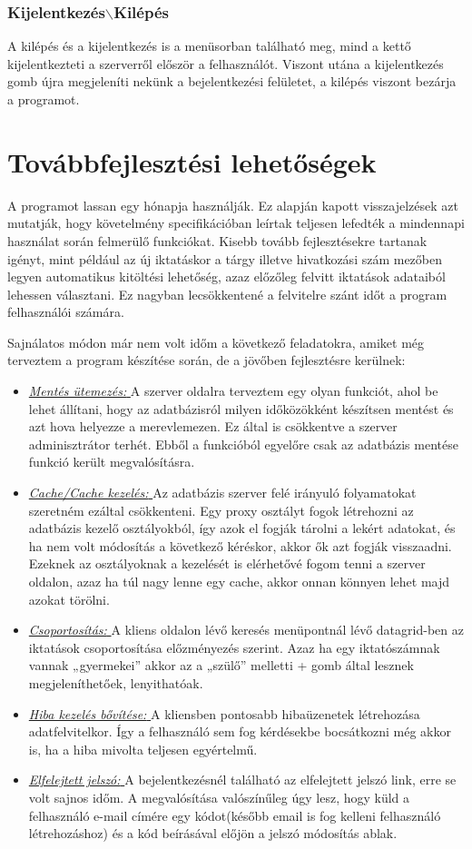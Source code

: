 \documentclass[
]{thesis-ekf}
\theoremstyle{definition}
\theoremstyle{remark}
\begin{document}
\subsection{Kijelentkezés$\backslash$Kilépés}
A kilépés és a kijelentkezés is a menüsorban található meg, mind a kettő kijelentkezteti a szerverről először a felhasználót. Viszont utána a kijelentkezés gomb újra megjeleníti nekünk a bejelentkezési felületet, a kilépés viszont bezárja a programot.
\chapter{Továbbfejlesztési lehetőségek}
A programot lassan egy hónapja használják. Ez alapján kapott visszajelzések azt mutatják, hogy követelmény specifikációban leírtak teljesen lefedték a mindennapi használat során felmerülő funkciókat. Kisebb tovább fejlesztésekre tartanak igényt, mint például az új iktatáskor a tárgy illetve hivatkozási szám mezőben legyen automatikus kitöltési lehetőség, azaz előzőleg felvitt iktatások adataiból lehessen választani. Ez nagyban lecsökkentené a felvitelre szánt időt a program felhasználói számára. 

Sajnálatos módon már nem volt időm a következő feladatokra, amiket még terveztem a program készítése során, de a jövőben fejlesztésre kerülnek:
\begin{itemize}[leftmargin=0pt]
	\item \underline{\textit{Mentés ütemezés: }}A szerver oldalra terveztem egy olyan funkciót, ahol be lehet állítani, hogy az adatbázisról milyen időközökként készítsen mentést és azt hova helyezze a merevlemezen. Ez által is csökkentve a szerver adminisztrátor terhét. Ebből a funkcióból egyelőre csak az adatbázis mentése funkció került megvalósításra. 
	\item \underline{\textit{Cache/Cache kezelés: }}Az adatbázis szerver felé irányuló folyamatokat szeretném ezáltal csökkenteni. Egy proxy osztályt fogok létrehozni az adatbázis kezelő osztályokból, így azok el fogják tárolni a lekért adatokat, és ha nem volt módosítás a következő kéréskor, akkor ők azt fogják visszaadni. Ezeknek az osztályoknak a kezelését is elérhetővé fogom tenni a szerver oldalon, azaz ha túl nagy lenne egy cache, akkor onnan könnyen lehet majd azokat törölni.
	\item \underline{\textit{Csoportosítás: }}A kliens oldalon lévő keresés menüpontnál lévő datagrid-ben az iktatások csoportosítása előzményezés szerint. Azaz ha egy iktatószámnak vannak „gyermekei” akkor az a „szülő” melletti + gomb által lesznek megjeleníthetőek, lenyithatóak. 
	\item \underline{\textit{Hiba kezelés bővítése: }}A kliensben pontosabb hibaüzenetek létrehozása adatfelvitelkor. Így a felhasználó sem fog kérdésekbe bocsátkozni még akkor is, ha a hiba mivolta teljesen egyértelmű.
	\item \underline{\textit{Elfelejtett jelszó: }}A bejelentkezésnél található az elfelejtett jelszó link, erre se volt sajnos időm. A megvalósítása valószínűleg úgy lesz, hogy küld a felhasználó e-mail címére egy kódot(később email is fog kelleni felhasználó létrehozáshoz) és a kód beírásával előjön a jelszó módosítás ablak.
\end{itemize}
\end{document}

